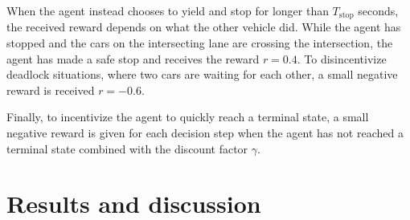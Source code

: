When the agent instead chooses to yield and stop for longer than $T_\mathrm{stop}$ seconds, the received reward depends on what the other vehicle did. 
While the agent has stopped and the cars on the intersecting lane are crossing the intersection, the agent has made a safe stop and receives the reward $r=0.4$. To disincentivize deadlock situations, where two cars are waiting for each other, a small negative reward is received $r=-0.6$. 

Finally, to incentivize the agent to quickly reach a terminal state, a small negative reward is given for each decision step when the agent has not reached a terminal state combined with the discount factor $\gamma$. 





\section{Results and discussion}
\label{sec:results}

